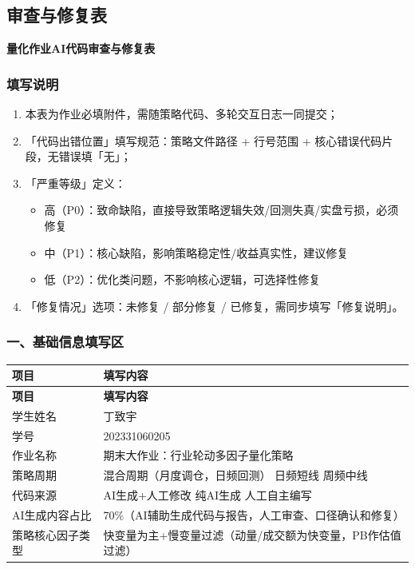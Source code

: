 \subsection{审查与修复表}
\begin{center}
\textbf{量化作业AI代码审查与修复表}
\end{center}

\subsubsection*{填写说明}
\begin{enumerate}
\item 本表为作业必填附件，需随策略代码、多轮交互日志一同提交；
\item 「代码出错位置」填写规范：策略文件路径 + 行号范围 + 核心错误代码片段，无错误填「无」；
\item 「严重等级」定义：
\begin{itemize}
\item 高（P0）：致命缺陷，直接导致策略逻辑失效/\allowbreak{}回测失真/\allowbreak{}实盘亏损，必须修复
\item 中（P1）：核心缺陷，影响策略稳定性/\allowbreak{}收益真实性，建议修复
\item 低（P2）：优化类问题，不影响核心逻辑，可选择性修复
\end{itemize}
\item 「修复情况」选项：未修复 /\allowbreak{} 部分修复 /\allowbreak{} 已修复，需同步填写「修复说明」。
\end{enumerate}
\subsubsection*{一、基础信息填写区}
\begingroup
\small
\setlength{\tabcolsep}{3pt}
\renewcommand{\arraystretch}{1.16}
\begin{longtable}{@{}L{0.24\textwidth}L{0.70\textwidth}@{}}
\toprule
\textbf{项目} & \textbf{填写内容} \\
\midrule
\endfirsthead
\toprule
\textbf{项目} & \textbf{填写内容} \\
\midrule
\endhead
\bottomrule
\endfoot
\bottomrule
\endlastfoot
学生姓名 & 丁致宇 \\
学号 & 202331060205 \\
作业名称 & 期末大作业：行业轮动多因子量化策略 \\
策略周期 & \checkedbox{} 混合周期（月度调仓，日频回测）  \uncheckedbox{} 日频短线  \uncheckedbox{} 周频中线 \\
代码来源 & \checkedbox{} AI生成+人工修改  \uncheckedbox{} 纯AI生成  \uncheckedbox{} 人工自主编写 \\
AI生成内容占比 & 70\%（AI辅助生成代码与报告，人工审查、口径确认和修复） \\
策略核心因子类型 & \checkedbox{} 快变量为主+慢变量过滤（动量/\allowbreak{}成交额为快变量，PB作估值过滤） \\
\end{longtable}
\endgroup
